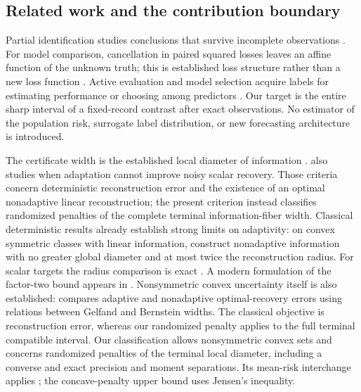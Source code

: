 \documentclass[12pt]{article}
\begin{document}
\subsection{Related work and the contribution boundary}
Partial identification studies conclusions that survive incomplete
observations \citep{manski,polo}. For model comparison, cancellation in
paired squared losses leaves an affine function of the unknown truth;
this is established loss structure rather than a new loss function
\citep{patton}. Active evaluation and model selection acquire labels for
estimating performance or choosing among predictors
\citep{sawade,hara,active,okanovic2025}. Our target is the entire sharp
interval of a fixed-record contrast after exact observations. No estimator
of the population risk, surrogate label distribution, or new forecasting
architecture is introduced.

The certificate width is the established local diameter of information
\citep[Section~4.1]{novak2008}.
\citet[Theorems~2--3 and~5]{osipenko} also studies when adaptation cannot
improve noisy scalar recovery. Those criteria concern deterministic
reconstruction error and the existence of an optimal nonadaptive linear
reconstruction; the present criterion instead classifies randomized
penalties of the complete terminal information-fiber width.
Classical deterministic results already establish strong limits on
adaptivity: on convex symmetric classes with linear information,
\citet[Theorem~4.4]{novak2008} construct nonadaptive information with
no greater global diameter and at most twice the reconstruction radius.
For scalar targets the radius comparison is exact
\citep[Theorem~4.5]{novak2008}. A modern formulation of the factor-two
bound appears in \citet[Proposition~4.1]{krieg2025}.
Nonsymmetric convex uncertainty itself is also established:
\citet{novak1995} compares adaptive and nonadaptive optimal-recovery
errors using relations between Gelfand and Bernstein widths. The
classical objective is reconstruction error, whereas our randomized
penalty applies to the full terminal compatible interval. Our classification allows nonsymmetric convex sets and concerns randomized
penalties of the terminal local diameter, including a converse and exact
precision and moment separations. Its mean-risk interchange applies
\citet[Theorem~3.4]{sion1958}; the concave-penalty upper bound uses Jensen's
inequality.
\end{document}
